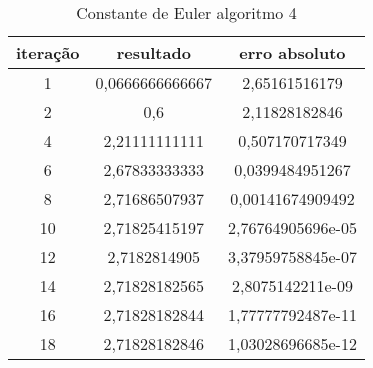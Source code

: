 \documentclass[12pt]{article}
\begin{document}


\begin{table}[ht]
\centering
\caption{Constante de Euler algoritmo 4}
\vspace{0.5cm}
\begin{tabular}{c|c|c}
\hline   
\hline   
iteração & resultado & erro absoluto\\
\hline   
1 & 0,0666666666667 & 2,65161516179 \\
2 & 0,6 & 2,11828182846 \\
4 & 2,21111111111 & 0,507170717349 \\
6 & 2,67833333333 & 0,0399484951267 \\
8 & 2,71686507937 & 0,00141674909492 \\
10 & 2,71825415197 & 2,76764905696e-05 \\
12 & 2,7182814905 & 3,37959758845e-07 \\
14 & 2,71828182565 & 2,8075142211e-09 \\
16 & 2,71828182844 & 1,77777792487e-11 \\
18 & 2,71828182846 & 1,03028696685e-12 \\
\hline   
\hline   
\end{tabular}
\label{tabeuler2}
\end{table}
\end{document}
